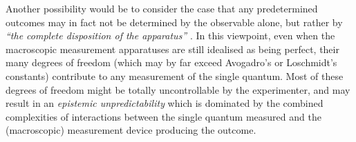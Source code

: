 \documentclass[%
 superscriptaddress,
 preprint,
 showpacs,
 showkeys,
 preprintnumbers,
  amsmath,amssymb,
  aps,
 pra,
  longbibliography,
  floatfix,
 ]{revtex4-1}
\theoremstyle{definition}
\begin{document}
Another possibility would be to consider the case that
any predetermined outcomes  %
may in fact not be determined by the observable alone, but rather by
{\em ``the complete disposition  of the apparatus''} \cite[Sec.~5]{bell-66}.
In this viewpoint, even when the macroscopic measurement apparatuses are still idealised as being perfect, their many degrees of freedom (which may by far exceed Avogadro's  or Loschmidt's constants) contribute to any measurement of the single quantum.
Most of these degrees of freedom might be totally uncontrollable by the experimenter, and may result in an {\em epistemic unpredictability} which is dominated by the combined complexities of interactions between the single quantum measured and the (macroscopic) measurement device producing the outcome.

\end{document}
